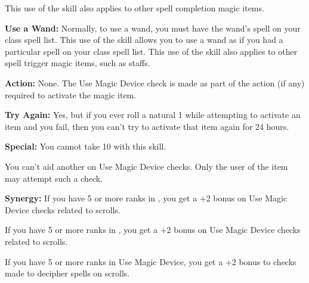 This use of the skill also applies to other spell completion magic items.

\textbf{Use a Wand:} Normally, to use a wand, you must have the wand's spell on your class spell list. This use of the skill allows you to use a wand as if you had a particular spell on your class spell list. This use of the skill also applies to other spell trigger magic items, such as staffs.

\textbf{Action:} None. The Use Magic Device check is made as part of the action (if any) required to activate the magic item.

\textbf{Try Again:} Yes, but if you ever roll a natural 1 while attempting to activate an item and you fail, then you can't try to activate that item again for 24 hours.

\textbf{Special:} You cannot take 10 with this skill.

You can't aid another on Use Magic Device checks. Only the user of the item may attempt such a check.

\textbf{Synergy:} If you have 5 or more ranks in , you get a +2 bonus on Use Magic Device checks related to scrolls.

If you have 5 or more ranks in , you get a +2 bonus on Use Magic Device checks related to scrolls.

If you have 5 or more ranks in Use Magic Device, you get a +2 bonus to  checks made to decipher spells on scrolls.
